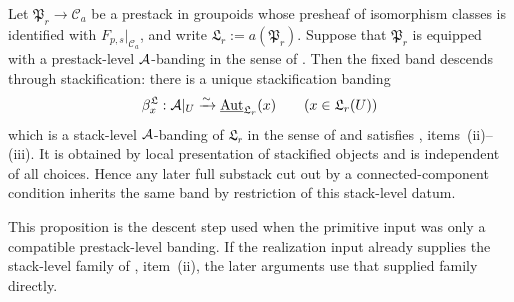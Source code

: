 \begin{proposition}\label{prop:stackification-band-descends}
Let $\mathfrak P_r\to\mathcal C_a$ be a prestack in groupoids whose presheaf of
isomorphism classes is identified with $F_{p,s}|_{\mathcal C_a}$, and write
$\mathfrak L_r:=a(\mathfrak P_r)$. Suppose that $\mathfrak P_r$ is equipped with
a prestack-level $\mathcal{A}$-banding in the sense of
. Then the fixed band descends through
stackification: there is a unique stackification banding
\[
\beta^{\mathfrak L}_x:\mathcal{A}|_U\xrightarrow{\sim}
\underline{\mathrm{Aut}}_{\mathfrak L_r}(x)
\qquad (x\in\mathfrak L_r(U))
\]
which is a stack-level $\mathcal{A}$-banding of $\mathfrak L_r$ in the sense of
 and satisfies
, items~\textup{(ii)--(iii)}. It is obtained by local
presentation of stackified objects and is independent of all choices. Hence any
later full substack cut out by a connected-component condition inherits the same
band by restriction of this stack-level datum.

This proposition is the descent step used when the primitive input was only a
compatible prestack-level banding. If the realization input already supplies the
stack-level family of , item~\textup{(ii)}, the later
arguments use that supplied family directly.
\end{proposition}

